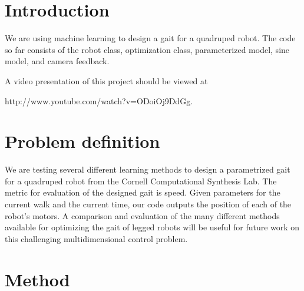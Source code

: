 \section{Introduction}

We are using machine learning to design a gait for a quadruped
robot. The code so far consists of the robot
class, optimization class, parameterized model, sine model, and camera
feedback. 

A video presentation of this project should be viewed at

http://www.youtube.com/watch?v=ODoiOj9DdGg.



\section{Problem definition}
We are testing several different learning methods to design a parametrized 
gait for a quadruped robot from the Cornell Computational Synthesis Lab. 
The metric for evaluation of the designed gait is speed. Given parameters 
for the current walk and the current time, our code outputs the position
of each of the robot's motors. A comparison and evaluation 
of the many different methods available for optimizing the gait of legged 
robots will be useful for future work on this challenging multidimensional 
control problem.

\section{Method}

